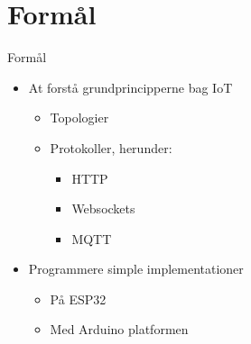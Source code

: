 \documentclass[aspectratio=169]{beamer}
\begin{document}
\section{Formål}
\begin{frame}{Formål}
	\begin{textBox}
		\begin{itemize}
			\item At forstå grundprincipperne bag IoT
			\begin{itemize}
				\item Topologier
				\item Protokoller, herunder:
				\begin{itemize}
					\item HTTP
					\item Websockets
					\item MQTT
				\end{itemize}
			\end{itemize}
			\item Programmere simple implementationer
			\begin{itemize}
				\item På ESP32
				\item Med Arduino platformen
			\end{itemize}
		\end{itemize}
	\end{textBox}
\end{frame}
\end{document}
